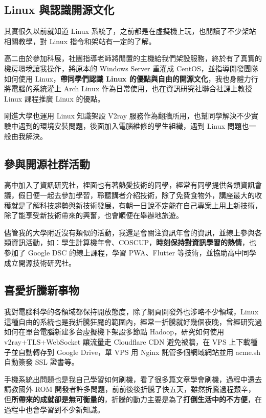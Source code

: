 \documentclass[classical]{einfart}
\begin{document}
\subsection{Linux 與認識開源文化}

其實很久以前就知道 Linux
系統了，之前都是在虛擬機上玩，也閱讀了不少架站相關教學，對 Linux
指令和架站有一定的了解。

高二由於參加科展，社團指導老師將閒置的主機給我們架設服務，終於有了真實的機房環境讓我操作，將原本的
Windows Server 重灌成 CentOS，並指導開發團隊如何使用
Linux，\textbf{帶同學們認識 Linux
的優點與自由的開源文化}，我也身體力行將電腦的系統灌上 Arch Linux
作為日常使用，也在資訊研究社聯合社課上教授 Linux 課程推廣 Linux 的優點。

剛進大學也運用 Linux 知識架設 V2ray
服務作為翻牆所用，也幫同學解決不少實驗中遇到的環境安裝問題，後面加入電腦維修的學生組織，遇到
Linux 問題也一般由我解決。


\subsection{參與開源社群活動}

高中加入了資訊研究社，裡面也有著熱愛技術的同學，經常有同學提供各類資訊會議，假日便一起去參加學習，聆聽講者介紹技術，除了免費食物外，講座最大的收穫就是了解科技趨勢與新技術發展，有朝一日說不定能在自己專案上用上新技術，除了能享受新技術帶來的興奮，也會順便在舉辦地旅遊。

儘管我的大學附近沒有類似的活動，我還是會關注資訊年會的資訊，並線上參與各類資訊活動，如：學生計算機年會、COSCUP，\textbf{時刻保持對資訊學習的熱情}，也參加了
Google DSC 的線上課程，學習 PWA、Flutter
等技術，並協助高中同學成立開源技術研究社。

\subsection{喜愛折騰新事物}

我對電腦科學的各領域都保持開放態度，除了網頁開發外也涉略不少領域，Linux
這種自由的系統也是我折騰狂魔的範圍內，經常一折騰就好幾個夜晚，曾經研究過如何在單台電腦新建多台虛擬機下架設多節點
Hadoop，研究如何使用 v2ray+TLS+WebSocket 讓流量走 Cloudflare CDN
避免被牆，在 VPS 上下載種子並自動轉存到 Google Drive，單 VPS 用 Nginx
託管多個網域網站並用 acme.sh 自動簽發 SSL 證書等。

手機系統出問題也是我自己學習如何刷機，看了很多篇文章學會刷機，過程中還去請教國外
ROM
開發者許多問題，前前後後折騰了快五天，雖然折騰過程艱辛，但\textbf{所帶來的成就卻是無可衡量的}，折騰的動力主要是為了\textbf{打倒生活中的不方便}，在過程中也會學習到不少新知識。
\end{document}
